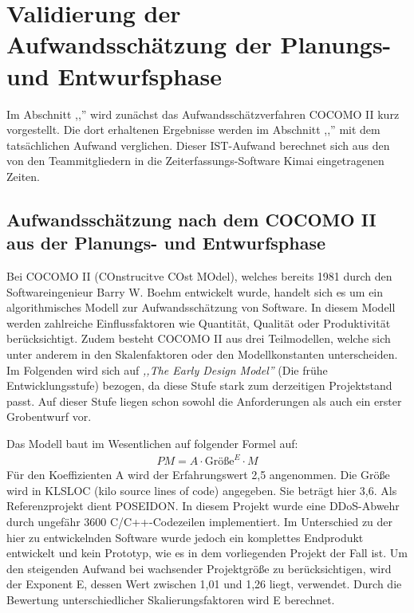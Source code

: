 \documentclass[../review_3.tex]{subfiles}
\begin{document}
\section{Validierung der Aufwandsschätzung der Planungs- und Entwurfsphase}
Im Abschnitt ,,'' wird zunächst das Aufwandsschätzverfahren COCOMO II  kurz vorgestellt. Die dort erhaltenen Ergebnisse werden im Abschnitt  ,,'' mit dem tatsächlichen Aufwand verglichen. Dieser IST-Aufwand berechnet sich aus den von den Teammitgliedern in die Zeiterfassungs-Software Kimai eingetragenen Zeiten.

\subsection{Aufwandsschätzung nach dem COCOMO II aus der Planungs- und Entwurfsphase} \label{kap1}
Bei COCOMO II (COnstrucitve COst MOdel), welches bereits 1981 durch den Softwareingenieur Barry W. Boehm entwickelt wurde, handelt sich es um ein algorithmisches Modell zur Aufwandsschätzung von Software. In diesem Modell werden zahlreiche Einflussfaktoren wie Quantität, Qualität oder Produktivität berücksichtigt. Zudem besteht COCOMO II aus drei Teilmodellen, welche sich unter anderem in den Skalenfaktoren oder den Modellkonstanten unterscheiden. Im Folgenden wird sich auf \textit{,,The Early Design Model''} (Die frühe Entwicklungsstufe) bezogen, da diese Stufe stark zum derzeitigen Projektstand passt. Auf dieser Stufe liegen schon sowohl die Anforderungen als auch ein erster Grobentwurf vor.

Das Modell baut im Wesentlichen auf folgender Formel auf:
\begin{align}
    PM = A \cdot \text{Größe}^E \cdot M
    \label{formel1}
\end{align}
Für den Koeffizienten A wird der Erfahrungswert 2,5 angenommen.
Die Größe wird in KLSLOC (kilo source lines of code) angegeben. Sie beträgt hier 3,6. Als Referenzprojekt dient POSEIDON\cite{testFab}.
In diesem Projekt wurde eine DDoS-Abwehr durch ungefähr 3600 C/C++-Codezeilen implementiert. Im Unterschied zu der hier zu entwickelnden Software wurde jedoch ein komplettes Endprodukt entwickelt und kein Prototyp, wie es in dem vorliegenden Projekt der Fall ist.
Um den steigenden Aufwand bei wachsender Projektgröße zu berücksichtigen, wird der Exponent E, dessen Wert zwischen 1,01 und 1,26 liegt, verwendet. Durch die Bewertung unterschiedlicher Skalierungsfaktoren wird E berechnet.
\end{document}
